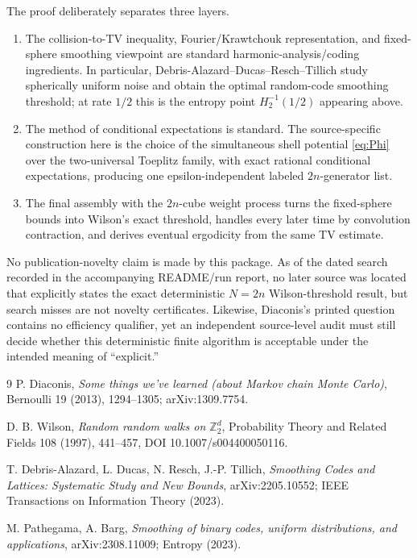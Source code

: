 \documentclass[11pt]{article}
\newcommand{\1}{\mathbf 1}
\begin{document}
The proof deliberately separates three layers.
\begin{enumerate}
\item The collision-to-TV inequality, Fourier/Krawtchouk representation, and fixed-sphere smoothing viewpoint are standard harmonic-analysis/coding ingredients.  In particular, Debris-Alazard--Ducas--Resch--Tillich study spherically uniform noise and obtain the optimal random-code smoothing threshold; at rate $1/2$ this is the entropy point $H_2^{-1}(1/2)$ appearing above.
\item The method of conditional expectations is standard.  The source-specific construction here is the choice of the simultaneous shell potential \eqref{eq:Phi} over the two-universal Toeplitz family, with exact rational conditional expectations, producing one epsilon-independent labeled $2n$-generator list.
\item The final assembly with the $2n$-cube weight process turns the fixed-sphere bounds into Wilson's exact threshold, handles every later time by convolution contraction, and derives eventual ergodicity from the same TV estimate.
\end{enumerate}

No publication-novelty claim is made by this package.  As of the dated search recorded in the accompanying README/run report, no later source was located that explicitly states the exact deterministic $N=2n$ Wilson-threshold result, but search misses are not novelty certificates.  Likewise, Diaconis's printed question contains no efficiency qualifier, yet an independent source-level audit must still decide whether this deterministic finite algorithm is acceptable under the intended meaning of ``explicit.''

\begin{thebibliography}{9}
P. Diaconis,
\emph{Some things we've learned (about Markov chain Monte Carlo)},
Bernoulli 19 (2013), 1294--1305; arXiv:1309.7754.

D. B. Wilson,
\emph{Random random walks on $\mathbb Z_2^d$},
Probability Theory and Related Fields 108 (1997), 441--457,
DOI 10.1007/s004400050116.

T. Debris-Alazard, L. Ducas, N. Resch, J.-P. Tillich,
\emph{Smoothing Codes and Lattices: Systematic Study and New Bounds},
arXiv:2205.10552; IEEE Transactions on Information Theory (2023).

M. Pathegama, A. Barg,
\emph{Smoothing of binary codes, uniform distributions, and applications},
arXiv:2308.11009; Entropy (2023).
\end{thebibliography}
\end{document}
